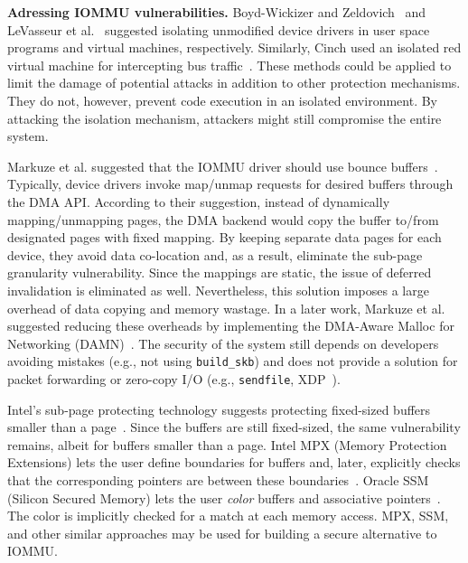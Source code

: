\smallskip
\noindent\textbf{Adressing IOMMU vulnerabilities.}
Boyd-Wickizer and Zeldovich~\cite{BWZ10} and LeVasseur et al.~\cite{LUSG04} suggested isolating unmodified device drivers in user space programs and virtual machines, respectively. Similarly, Cinch used an isolated red virtual machine for intercepting bus traffic~\cite{AWH16}. These methods could be applied to limit the damage of potential attacks in addition to other protection mechanisms. They do not, however, prevent code execution in an isolated environment. By attacking the isolation mechanism, attackers might still compromise the entire system.

Markuze et al. suggested that the IOMMU driver should use bounce buffers~\cite{MMT16}. Typically, device drivers invoke map/unmap requests for desired buffers through the DMA API. According to their suggestion, instead of dynamically mapping/unmapping pages, the DMA backend would copy the buffer to/from designated pages with fixed mapping. By keeping separate data pages for each device, they avoid data co-location and, as a result, eliminate the sub-page granularity vulnerability. Since the mappings are static, the issue of deferred invalidation is eliminated as well. 
%
Nevertheless, this solution imposes a large overhead of data copying and memory wastage. In a later work, Markuze et al. suggested reducing these overheads by implementing the DMA-Aware Malloc for Networking (DAMN)~\cite{MSMT18}. The security of the system still depends on developers avoiding mistakes (e.g., not using \texttt{build\_skb}) and does not provide a solution for packet forwarding or zero-copy I/O (e.g., \texttt{sendfile}, XDP~\cite{xdp}). %

Intel’s sub-page protecting technology suggests protecting fixed-sized buffers smaller than a page~\cite{Int18}. Since the buffers are still fixed-sized, the same vulnerability remains, albeit for buffers smaller than a page. Intel MPX (Memory Protection Extensions) lets the user define boundaries for buffers and, later, explicitly checks that the corresponding pointers are between these boundaries~\cite{Int16a}. Oracle SSM (Silicon Secured Memory) lets the user \emph{color} buffers and associative pointers~\cite{Ora15}. The color is implicitly checked for a match at each memory access. MPX, SSM, and other similar approaches may be used for building a secure alternative to IOMMU. 

